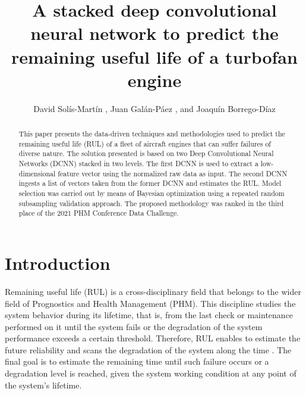 \documentclass[PHM, 2021]{PHMSociety}
\begin{document}
\title{A stacked deep convolutional neural network to predict the remaining useful life of a turbofan engine}




\author{David Solís-Martín  , Juan Galán-Páez , and Joaquín Borrego-Díaz 
}

\address{ \tabularnewline {} }

\maketitle




\begin{abstract}

This paper presents the data-driven techniques and methodologies used to predict the remaining useful life (RUL) of a fleet of aircraft engines that can suffer failures of diverse nature. The solution presented is based on two Deep Convolutional Neural Networks (DCNN) stacked in two levels. The first DCNN is used to extract a low-dimensional feature vector using the normalized raw data as input. The second DCNN ingests a list of vectors taken from the former DCNN and estimates the RUL. Model selection was carried out by means of Bayesian optimization using a repeated random subsampling validation approach. The proposed methodology was ranked in the third place of the 2021 PHM Conference Data Challenge.
\end{abstract}

\section{Introduction}

Remaining useful life (RUL) is a cross-disciplinary field that belongs to the wider field of Prognostics and Health Management (PHM). This discipline studies the system behavior during its lifetime, that is, from the last check or maintenance performed on it until the system fails or the degradation of the system performance exceeds a certain threshold. Therefore, RUL enables to estimate the future reliability and scans the degradation of the system along the time \cite{peng2018switching}. The final goal is to estimate the remaining time until such failure occurs or a degradation level is reached, given the system working condition at any point of the system's lifetime.
\end{document}
